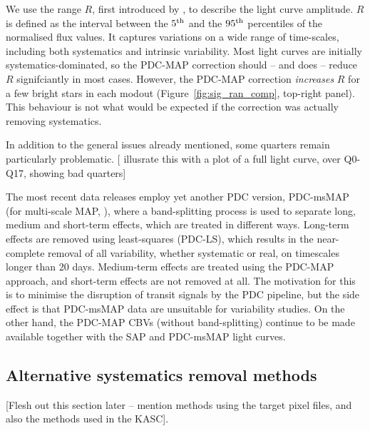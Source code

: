 \documentclass[useAMS,usenatbib]{mn2e}
\begin{document}
We use the range $R$, first introduced by \citet{bas+10a,bas+10b}, to
describe the light curve amplitude. $R$ is defined as the interval
between the $5^{\rm th}$ and the $95^{\rm th}$ percentiles of the
normalised flux values. It captures variations on a wide range of
time-scales, including both systematics and intrinsic
variability. Most light curves are initially systematics-dominated, so
the PDC-MAP correction should -- and does -- reduce $R$ signifciantly
in most cases. However, the PDC-MAP correction \emph{increases} $R$
for a few bright stars in each modout (Figure~\ref{fig:sig_ran_comp},
top-right panel). This behaviour is not what would be expected if the
correction was actually removing systematics. 

In addition to the general issues already mentioned, some quarters remain
particularly problematic. [ illusrate this with a
plot of a full light curve, over Q0-Q17, showing bad quarters]

The most recent data releases employ yet another PDC version,
PDC-msMAP (for multi-scale MAP, \citealt{stu+12b}), where a
band-splitting process is used to separate long, medium and short-term
effects, which are treated in different ways. Long-term effects are
removed using least-squares (PDC-LS), which results in the
near-complete removal of all variability, whether systematic or real,
on timescales longer than 20 days. Medium-term effects are treated
using the PDC-MAP approach, and short-term effects are not removed at
all. The motivation for this is to minimise the disruption of transit
signals by the PDC pipeline, but the side effect is that PDC-msMAP
data are unsuitable for variability studies. On the other hand, the
PDC-MAP CBVs (without band-splitting) continue to be made available
together with the SAP and PDC-msMAP light curves.

\subsection{Alternative systematics removal methods}

[Flesh out this section later -- mention methods using the target pixel
files, and also the methods used in the KASC]. 
\end{document}
